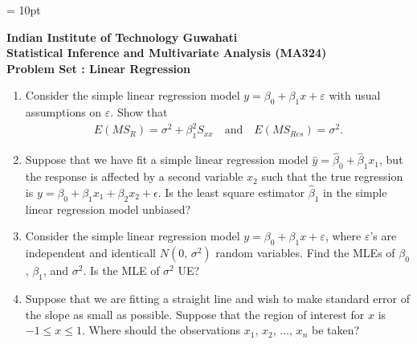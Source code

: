 \documentclass[12pt]{article}%
\begin{document}
\parskip = 10pt

\begin{center}
   \textbf{Indian Institute of Technology Guwahati\\ Statistical Inference and
      Multivariate Analysis (MA324) \\ Problem Set : Linear Regression}
\end{center}

\singlespacing

\begin{enumerate}[leftmargin=*]


   \item Consider the simple linear regression model $y=\beta_0 + \beta_1 x +
      \varepsilon$ with usual assumptions on $\varepsilon$. Show that
      \begin{align*}
         E\left( MS_R \right) = \sigma^2 + \beta_1^2 S_{xx} \quad\text{and}\quad E\left(
         MS_{Res} \right) = \sigma^2.
      \end{align*}

   \item Suppose that we have fit a simple linear regression model $\widehat
      y=\widehat\beta_0+\widehat\beta_1x_1$, but the response is affected by a second
      variable $x_2$ such that the true regression is
      $y=\beta_0+\beta_1x_1+\beta_2x_2+\epsilon$. Is the least square estimator
      $\widehat\beta_1$ in the simple linear regression model unbiased?

   \item Consider the simple linear regression model $y=\beta_0 + \beta_1 x +
      \varepsilon$, where $\varepsilon$'s are independent and identicall $N(0,\,\sigma^2)$
      random variables. Find the MLEs of $\beta_0$, $\beta_1$, and $\sigma^2$. Is the MLE
      of $\sigma^2$ UE?

   \item Suppose that we are fitting a straight line and wish to make standard error of
      the slope as small as possible. Suppose that the region of interest for $ x$ is
      $-1\le x\le 1$. Where should the observations $x_1,\,x_2,\,\ldots,\,x_n$ be taken?


\end{enumerate}
\end{document}
